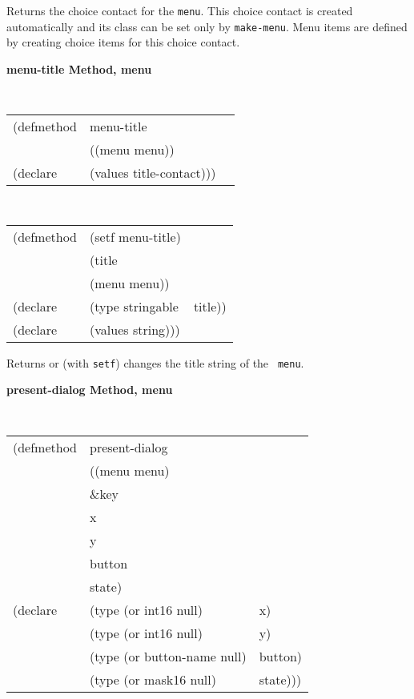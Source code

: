 \begin{flushright} \parbox[t]{6.125in}{
Returns the choice contact for the {\tt menu}. This choice contact is created
automatically and its class can be set only by {\tt make-menu}.  Menu items are
defined by creating choice items for this choice contact.}\end{flushright}

{\samepage
{\large {\bf menu-title \hfill Method, menu}}
\begin{flushright} \parbox[t]{6.125in}{
\tt
\begin{tabular}{lll}
\raggedright
(defmethod & menu-title & \\
& ((menu  menu)) \\
(declare & (values title-contact)))
\end{tabular}
\rm

}\end{flushright}}

{\samepage
\begin{flushright} \parbox[t]{6.125in}{
\tt
\begin{tabular}{lll}
\raggedright
(defmethod & (setf menu-title) & \\
         & (title \\
         & (menu menu)) \\
(declare &(type stringable & title))\\
(declare &(values string)))
\end{tabular}
\rm
}
\end{flushright}}



\begin{flushright} \parbox[t]{6.125in}{
Returns or (with {\tt setf}) changes the title string of the {\tt
menu}.} 
\end{flushright}

{\samepage
{\large {\bf present-dialog \hfill Method, menu}}
\begin{flushright} \parbox[t]{6.125in}{
\tt
\begin{tabular}{lll}
\raggedright
(defmethod & present-dialog & \\
           & ((menu  menu)\\
        & \&key \\
        & x \\
        & y\\
        & button\\
        & state)\\
(declare & (type (or int16 null)  & x)\\
         & (type (or int16 null)  & y)\\
        & (type (or button-name null) & button)\\ 
        & (type (or mask16 null)  & state)))\\ 
\end{tabular}
\rm

}\end{flushright}}



